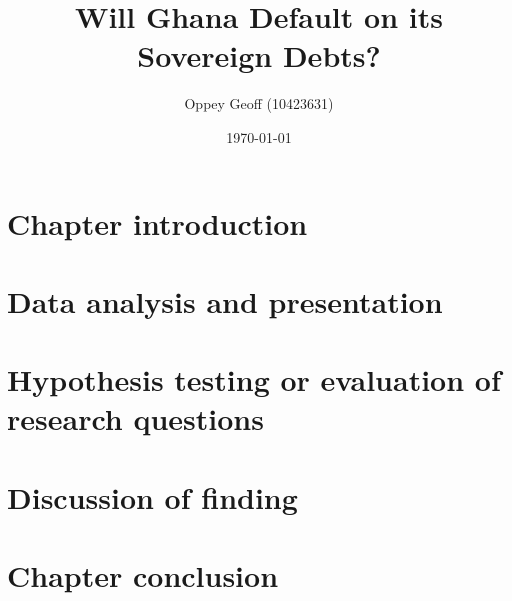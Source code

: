 \documentclass[a4paper, 12pt]{article}
\author{Oppey Geoff (10423631)}
\title{Will Ghana Default on its Sovereign Debts?}
\date{\today}
\begin{document}
	\maketitle
	\clearpage
	\tableofcontents
	\newpage
	\newpage
	\doublespacing
	\section{Chapter introduction}
    \section{Data analysis and presentation}
	\section{Hypothesis testing or evaluation of research questions}
	\section{Discussion of finding}
	\section{Chapter conclusion}
	\newpage
	\singlespacing
		
	
\end{document}
